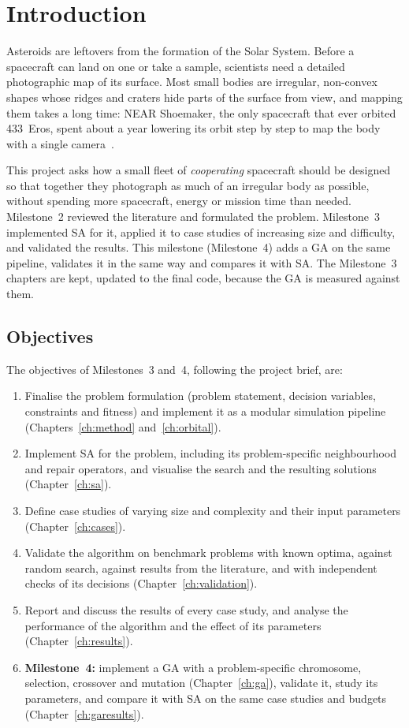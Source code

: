 \chapter{Introduction}
\label{ch:intro}

Asteroids are leftovers from the formation of the Solar System. Before a spacecraft can land on
one or take a sample, scientists need a detailed photographic map of its surface. Most small
bodies are irregular, non-convex shapes whose ridges and craters hide parts of the surface from
view, and mapping them takes a long time: NEAR Shoemaker, the only spacecraft that ever orbited
433~Eros, spent about a year lowering its orbit step by step to map the body with a single
camera~\cite{dunham2002}.

This project asks how a small fleet of \emph{cooperating} spacecraft should be designed so that
together they photograph as much of an irregular body as possible, without spending more
spacecraft, energy or mission time than needed. Milestone~2 reviewed the literature and
formulated the problem. Milestone~3 implemented \acf{SA} for it, applied it to case studies of
increasing size and difficulty, and validated the results. This milestone (Milestone~4) adds a
\acf{GA} on the same pipeline, validates it in the same way and compares it with \ac{SA}. The
Milestone~3 chapters are kept, updated to the final code, because the \ac{GA} is measured against them.

\section{Objectives}
The objectives of Milestones~3 and~4, following the project brief, are:
\begin{enumerate}
\item Finalise the problem formulation (problem statement, decision variables, constraints and
fitness) and implement it as a modular simulation pipeline (Chapters~\ref{ch:method}
and~\ref{ch:orbital}).
\item Implement \ac{SA} for the problem, including its problem-specific neighbourhood and repair
operators, and visualise the search and the resulting solutions (Chapter~\ref{ch:sa}).
\item Define case studies of varying size and complexity and their input parameters
(Chapter~\ref{ch:cases}).
\item Validate the algorithm on benchmark problems with known optima, against random search,
against results from the literature, and with independent checks of its decisions
(Chapter~\ref{ch:validation}).
\item Report and discuss the results of every case study, and analyse the performance of the
algorithm and the effect of its parameters (Chapter~\ref{ch:results}).
\item \textbf{Milestone~4:} implement a \ac{GA} with a problem-specific chromosome, selection,
crossover and mutation (Chapter~\ref{ch:ga}), validate it, study its parameters, and compare it
with \ac{SA} on the same case studies and budgets (Chapter~\ref{ch:garesults}).
\end{enumerate}

